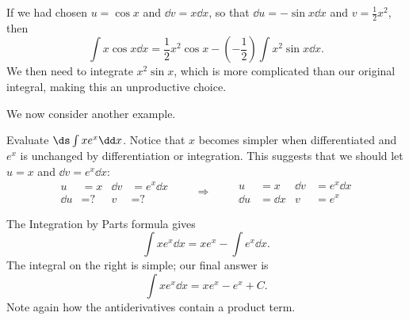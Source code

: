 If we had chosen $u=\cos x$ and $\dd v=x\dd x$, so that $\dd u=-\sin x\dd x$ and $v=\frac12x^2$, then
\[\int x\cos x\dd x=\frac12x^2\cos x-\left(-\frac12\right)\int x^2\sin x\dd x.\]
We then need to integrate $x^2\sin x$, which is more complicated than our original integral, making this an unproductive choice.



We now consider another example.

\begin{example}\label{ex_ibp2}
Evaluate $\ds\int x e^x\dd x$.
\solution
Notice that $x$ becomes simpler when differentiated and $e^x$ is unchanged by differentiation or integration. This suggests that we should let $u=x$ and $\dd v=e^x\dd x$:
\[
\begin{aligned}
u&= x & \dd v&=e^x\dd x\\
\dd u&= \text{?} & v&=\text{?}
\end{aligned}
\qquad\Rightarrow\qquad
\begin{aligned}
u&= x & \dd v&=e^x\dd x\\
\dd u&= \dd x & v&=e^x
\end{aligned}
\]

The Integration by Parts formula gives
\[\int x e^x\dd x = xe^x - \int e^x\dd x.\]
The integral on the right is simple; our final answer is
\[\int xe^x\dd x = xe^x - e^x + C.\]
Note again how the antiderivatives contain a product term.
\end{example}


